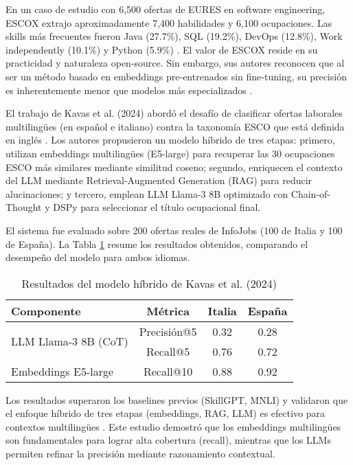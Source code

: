 En un caso de estudio con 6,500 ofertas de EURES en software engineering, ESCOX extrajo aproximadamente 7,400 habilidades y 6,100 ocupaciones. Las skills más frecuentes fueron Java (27.7\%), SQL (19.2\%), DevOps (12.8\%), Work independently (10.1\%) y Python (5.9\%) \cite{kavargyris2025}. El valor de ESCOX reside en su practicidad y naturaleza open-source. Sin embargo, sus autores reconocen que al ser un método basado en embeddings pre-entrenados sin fine-tuning, su precisión es inherentemente menor que modelos más especializados \cite{kavargyris2025}.

El trabajo de Kavas et al. (2024) abordó el desafío de clasificar ofertas laborales multilingües (en español e italiano) contra la taxonomía ESCO que está definida en inglés \cite{kavas2024}. Los autores propusieron un modelo híbrido de tres etapas: primero, utilizan embeddings multilingües (E5-large) para recuperar las 30 ocupaciones ESCO más similares mediante similitud coseno; segundo, enriquecen el contexto del LLM mediante Retrieval-Augmented Generation (RAG) para reducir alucinaciones; y tercero, emplean LLM Llama-3 8B optimizado con Chain-of-Thought y DSPy para seleccionar el título ocupacional final.

El sistema fue evaluado sobre 200 ofertas reales de InfoJobs (100 de Italia y 100 de España). La Tabla \ref{tab:kavas-results} resume los resultados obtenidos, comparando el desempeño del modelo para ambos idiomas.

\begin{table}[H]
\centering
\caption{Resultados del modelo híbrido de Kavas et al. (2024)}
\label{tab:kavas-results}
\small
\begin{tabular}{|l|c|c|c|}
\hline
\textbf{Componente} & \textbf{Métrica} & \textbf{Italia} & \textbf{España} \\
\hline
\multirow{2}{*}{LLM Llama-3 8B (CoT)} & Precisión@5 & 0.32 & 0.28 \\
\cline{2-4}
 & Recall@5 & 0.76 & 0.72 \\
\hline
Embeddings E5-large & Recall@10 & 0.88 & 0.92 \\
\hline
\end{tabular}
\end{table}

Los resultados superaron los baselines previos (SkillGPT, MNLI) y validaron que el enfoque híbrido de tres etapas (embeddings, RAG, LLM) es efectivo para contextos multilingües \cite{kavas2024}. Este estudio demostró que los embeddings multilingües son fundamentales para lograr alta cobertura (recall), mientras que los LLMs permiten refinar la precisión mediante razonamiento contextual.

